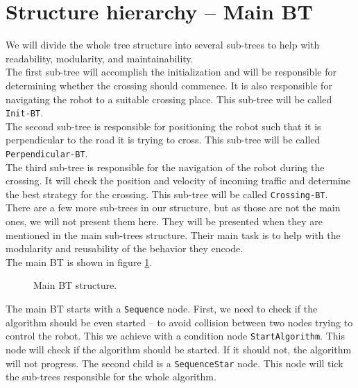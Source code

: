 \section{Structure hierarchy -- Main BT}
    We will divide the whole tree structure into several sub-trees to help with readability, modularity, and maintainability.\\
    The first sub-tree will accomplish the initialization and will be responsible for determining whether the crossing should commence. It is also responsible for navigating the robot to a suitable crossing place. This sub-tree will be called \texttt{Init-BT}.\\
    The second sub-tree is responsible for positioning the robot such that it is perpendicular to the road it is trying to cross. This sub-tree will be called \texttt{Perpendicular-BT}.\\
    The third sub-tree is responsible for the navigation of the robot during the crossing. It will check the position and velocity of incoming traffic and determine the best strategy for the crossing. This sub-tree will be called \texttt{Crossing-BT}.\\
    There are a few more sub-trees in our structure, but as those are not the main ones, we will not present them here. They will be presented when they are mentioned in the main sub-trees structure. Their main task is to help with the modularity and reusability of the behavior they encode.\\
    The main BT is shown in figure \ref{fig:main-BT}.\\
    \begin{figure}[ht]
        \caption{Main BT structure.}
        \label{fig:main-BT}
    \end{figure}
    The main BT starts with a \texttt{Sequence} node. First, we need to check if the algorithm should be even started -- to avoid collision between two nodes trying to control the robot. This we achieve with a condition node \texttt{StartAlgorithm}. This node will check if the algorithm should be started. If it should not, the algorithm will not progress. The second child is a \texttt{SequenceStar} node. This node will tick the sub-trees responsible for the whole algorithm.\\
